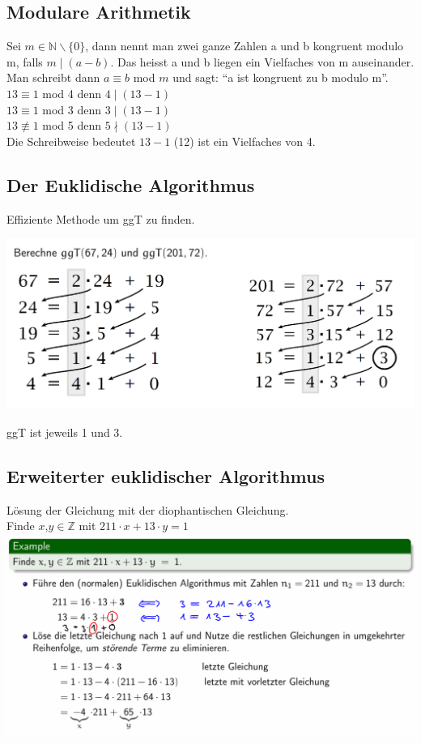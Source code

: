 \documentclass[12pt]{scrartcl}
\begin{document}
\subsection{Modulare Arithmetik}
Sei $m \in \mathbb{N} \backslash \{0\}$, dann nennt man zwei ganze Zahlen a und b kongruent modulo m, falls $m\mid (a - b)$.
Das heisst a und b liegen ein Vielfaches von m auseinander. Man schreibt dann $a \equiv b$ mod $m$ und sagt:
``a ist kongruent zu b modulo m''.\\

$13 \equiv 1$ mod 4 denn $4 \mid (13 - 1)$\\
$13 \equiv 1$ mod 3 denn $3 \mid (13 - 1)$\\
$13 \not\equiv  1$ mod 5 denn $5 \nmid (13 - 1)$\\

Die Schreibweise bedeutet $13 - 1$ (12) ist ein Vielfaches von 4.\\

\subsection{Der Euklidische Algorithmus}
Effiziente Methode um ggT zu finden.

\includegraphics[width=15cm]{img/euqlidic_algorithm.png}

ggT ist jeweils 1 und 3.


\newpage
\subsection{Erweiterter euklidischer Algorithmus}
Lösung der Gleichung mit der diophantischen Gleichung.\\

Finde $x$,$y \in \mathbb{Z}$ mit $211 \cdot x + 13 \cdot y = 1$\\ 

\includegraphics[width=14cm]{img/erweiterter_euklidischer_algorithmus.png}
\end{document}
